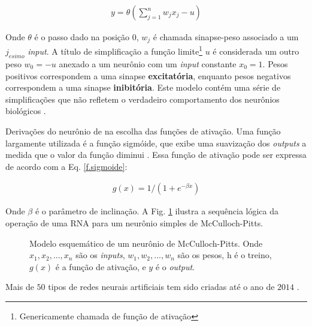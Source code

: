 \begin{eqnarray}
y=\theta \left( \sum^{n}_{j=1} w_{j} x_{j} -u \right)
\label{Eq.neuronio-McCulloch}
\end{eqnarray}

Onde $\theta$ é o passo dado na posição $0$, $w_{j}$ é chamada sinapse-peso associado a um $j_{esimo}$ \textit{input}. A título de simplificação a função limite\footnote{Genericamente chamada de função de ativação} $u$ é considerada um outro peso $w_{0}=-u$ anexado a um neurônio com um \textit{input} constante $x_{0}=1$. Pesos positivos correspondem a uma sinapse \textbf{excitatória}, enquanto pesos negativos correspondem a uma sinapse \textbf{inibitória}. Este modelo contém uma série de simplificações que não refletem o verdadeiro comportamento dos neurônios biológicos \citep{Mao1996}.  

Derivações do neurônio de \citet{McCulloch1943} na escolha das funções de ativação. Uma função largamente utilizada é a função sigmóide, que exibe uma suavização dos \textit{outputs} a medida que o valor da função diminui \citep{Mao1996,Misra2010}. Essa função de ativação pode ser expressa de acordo com a Eq. \ref{f.sigmoide}:

\begin{eqnarray}
g(x)=1/(1+e^{-\beta x})
\label{f.sigmoide}
\end{eqnarray}

Onde $\beta$ é o parâmetro de inclinação. A Fig. \ref{Esquematico de McCulloch} ilustra a sequência lógica da operação de uma RNA para um neurônio simples de McCulloch-Pitts. 
\\
\begin{figure}[H]
	\centering
	\setlength{\fboxsep}{8pt}
	\setlength{\fboxrule}{0.1pt}
	\caption{Modelo esquemático de um neurônio de McCulloch-Pitts. Onde $x_{1}, x_{2}, ..., x_{n}$ são os \textit{inputs}, $w_{1}, w_{2}, ..., w_{n}$ são os pesos, h é o treino, $g(x)$ é a função de ativação, e $y$ é o \textit{output}.}
	\label{Esquematico de McCulloch}
\end{figure}

Mais de $50$ tipos de redes neurais artificiais tem sido criadas até o ano de $2014$ \citep{Saljooghi2014}.

